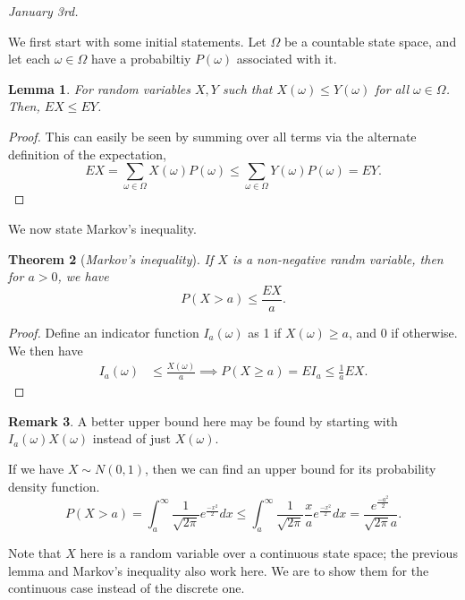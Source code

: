 \documentclass[15pt,a4paper]{book}
\newtheorem{theorem}{Theorem}[chapter]
\newtheorem{lemma}[theorem]{Lemma}
\theoremstyle{definition}
\newtheorem{remark}[theorem]{Remark}
\newcommand{\eax}[1]{\emph{#1}\index{#1}} %
\begin{document}
\textit{January 3rd.}

We first start with some initial statements.
Let $\Omega$ be a countable state space, and let each $\omega \in \Omega$ have a probabiltiy $P(\omega)$ associated with it.

\begin{lemma}
    For random variables $X,Y$ such that $X(\omega) \leq Y(\omega)$ for all $\omega \in \Omega$. Then, $EX \leq EY$.
\end{lemma}
\begin{proof}
    This can easily be seen by summing over all terms via the alternate definition of the expectation,
    \begin{equation}
        EX = \sum_{\omega \in \Omega} X(\omega) P(\omega) \leq \sum_{\omega \in \Omega} Y(\omega) P(\omega) = EY.
    \end{equation}
\end{proof}

We now state Markov's inequality. 

\begin{theorem}[\eax{Markov's inequality}]
    If $X$ is a non-negative randm variable, then for $a > 0$, we have
    \begin{equation}
        P(X > a) \leq \frac{EX}{a}.
    \end{equation}
\end{theorem}
\begin{proof}
    Define an indicator function $I_{a}(\omega)$ as 1 if $X(\omega) \geq a$, and 0 if otherwise. We then have
    \begin{align}
        I_{a}(\omega) &\leq \frac{X(\omega)}{a} \implies P(X \geq a) = EI_{a} \leq \frac{1}{a} EX.
    \end{align}
\end{proof}
\begin{remark}
    A better upper bound here may be found by starting with $I_{a}(\omega)X(\omega)$ instead of just $X(\omega)$.
\end{remark}
If we have $X \sim N(0,1)$, then we can find an upper bound for its probability density function.
\begin{equation}
    P(X > a) = \int_{a}^{\infty} \frac{1}{\sqrt{2\pi}} e^{\frac{-x^{2}}{2}} dx \leq \int_{a}^{\infty} \frac{1}{\sqrt{2\pi}} \frac{x}{a} e^{\frac{-x^{2}}{2}} dx = \frac{e^{\frac{-a^{2}}{2}}}{\sqrt{2\pi}a}.
\end{equation}

Note that $X$ here is a random variable over a continuous state space; the previous lemma and Markov's inequality also work here. We are to show them for the continuous case instead of the discrete one.
\end{document}
